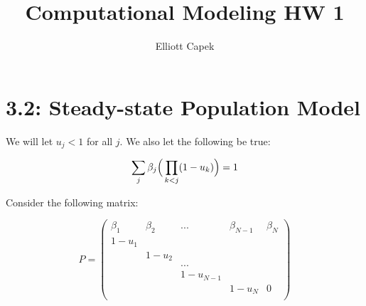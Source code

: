 \documentclass[10pt]{article} %
\title{Computational Modeling HW 1}
\author{Elliott Capek}
\begin{document}
\maketitle{}

\section{3.2: Steady-state Population Model}

We will let $u_j < 1$ for all $j$. We also let the following be true:

\begin{equation*}
  \sum_j \beta_j \Big(\prod_{k<j}(1-u_k) \Big) = 1\\
\end{equation*}

Consider the following matrix:

\begin{equation}
  P = 
   \begin{pmatrix}
     \beta_1 & \beta_2 & ... & \beta_{N-1} & \beta_N\\
     1-u_1 & & & &\\
     & 1-u_2 & & &\\
     & & ... & &\\
     & & 1-u_{N-1} & &\\
     & & & 1-u_{N} & 0\\
   \end{pmatrix}
\end{equation}
\end{document}
